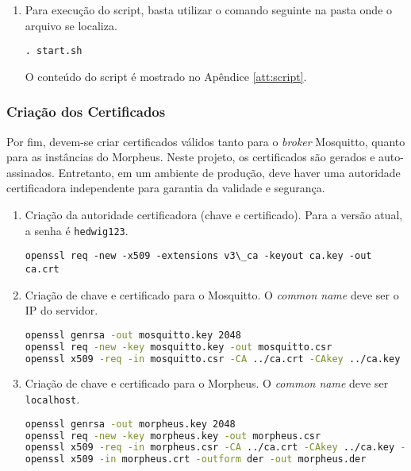 \begin{enumerate}
\textbf{passwd}

\begin{lstlisting}[language=bash]
    0002D3D7:135876
    01344682:374028
    000750A1:524708
    001A1B07:321115
    0014BB3E:147203
    asd561asd5asd984faee:852456987
\end{lstlisting}

\item Para execução do script, basta utilizar o comando seguinte na pasta onde o arquivo se localiza.

\lstinline{. start.sh}

O conteúdo do script é mostrado no Apêndice \ref{att:script}.
\end{enumerate}

\subsubsection{Criação dos Certificados}

Por fim, devem-se criar certificados válidos tanto para o \emph{broker} Mosquitto, quanto para as instâncias do Morpheus. Neste projeto, os certificados são gerados e auto-assinados. Entretanto, em um ambiente de produção, deve haver uma autoridade certificadora independente para garantia da validade e segurança.

\begin{enumerate}
\item
Criação da autoridade certificadora (chave e certificado). Para a versão atual, a senha é \texttt{hedwig123}.

\lstinline{openssl req -new -x509 -extensions v3\_ca -keyout ca.key -out ca.crt}
\item
Criação de chave e certificado para o Mosquitto. O \emph{common name} deve ser o IP do servidor.

\begin{lstlisting}[language=bash]
openssl genrsa -out mosquitto.key 2048
openssl req -new -key mosquitto.key -out mosquitto.csr
openssl x509 -req -in mosquitto.csr -CA ../ca.crt -CAkey ../ca.key -CAcreateserial -out mosquitto.crt -days 3650 -sha256
\end{lstlisting}

\item
Criação de chave e certificado para o Morpheus. O \emph{common name} deve ser \texttt{localhost}.

\begin{lstlisting}[language=bash]
openssl genrsa -out morpheus.key 2048
openssl req -new -key morpheus.key -out morpheus.csr
openssl x509 -req -in morpheus.csr -CA ../ca.crt -CAkey ../ca.key -CAcreateserial -out morpheus.crt -days 3650 -sha256 -addtrust clientAuth
openssl x509 -in morpheus.crt -outform der -out morpheus.der
\end{lstlisting}
\end{enumerate}

